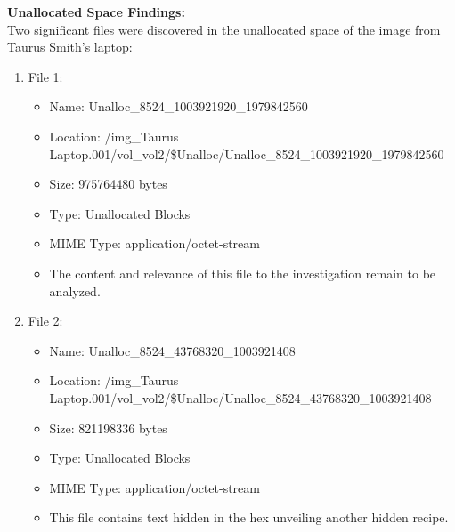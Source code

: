 \textbf{Unallocated Space Findings:}\\
Two significant files were discovered in the unallocated space of the image from Taurus Smith's laptop:
\begin{enumerate}
    \item File 1:
    \begin{itemize}
        \item Name: Unalloc\_8524\_1003921920\_1979842560
        \item Location: /img\_Taurus Laptop.001/vol\_vol2/\$Unalloc/Unalloc\_8524\_1003921920\_1979842560
        \item Size: 975764480 bytes
        \item Type: Unallocated Blocks
        \item MIME Type: application/octet-stream
        \item The content and relevance of this file to the investigation remain to be analyzed.
    \end{itemize}
    
    \item File 2:
    \begin{itemize}
        \item Name: Unalloc\_8524\_43768320\_1003921408
        \item Location: /img\_Taurus Laptop.001/vol\_vol2/\$Unalloc/Unalloc\_8524\_43768320\_1003921408
        \item Size: 821198336 bytes
        \item Type: Unallocated Blocks
        \item MIME Type: application/octet-stream
        \item This file contains text hidden in the hex unveiling another hidden recipe.
    \end{itemize}
\end{enumerate}


